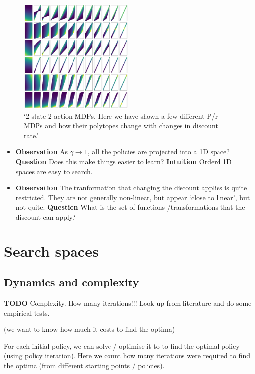 \begin{figure}
\centering
\includegraphics[width=0.5\textwidth,height=0.5\textheight]{../../pictures/figures/discounts.png}
\caption{`2-state 2-action MDPs. Here we have shown a few different P/r
MDPs and how their polytopes change with changes in discount rate.'}
\end{figure}

\begin{itemize}
\item
  \textbf{Observation} As \(\gamma \to 1\), all the policies are
  projected into a 1D space? \textbf{Question} Does this make things
  easier to learn? \textbf{Intuition} Orderd 1D spaces are easy to
  search.
\item
  \textbf{Observation} The tranformation that changing the discount
  applies is quite restricted. They are not generally non-linear, but
  appear `close to linear', but not quite. \textbf{Question} What is the
  set of functions /transformations that the discount can apply?
\end{itemize}


\section{Search spaces}
\subsection{Dynamics and complexity}

\textbf{TODO} Complexity. How many iterations!!! Look up from literature
and do some empirical tests.

(we want to know how much it costs to find the optima)

For each initial policy, we can solve / optimise it to to find the
optimal policy (using policy iteration). Here we count how many
iterations were required to find the optima (from different starting
points / policies).


